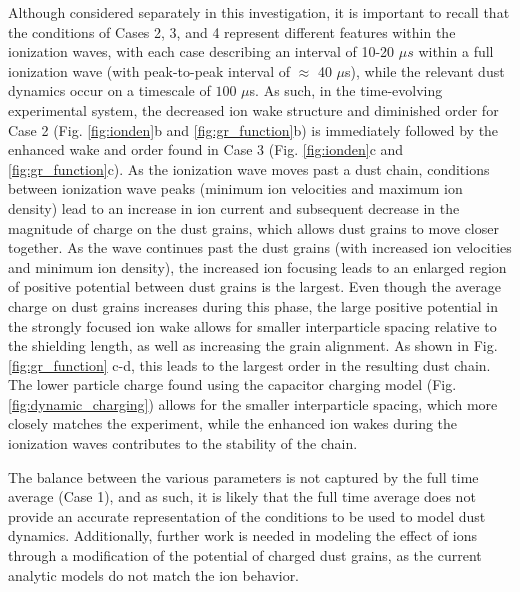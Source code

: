 \documentclass[aip,amsmath,amssymb,graphicx,floatfix,reprint]{revtex4-1}
\begin{document}
Although considered separately in this investigation, it is important to recall that the conditions of Cases 2, 3, and 4 represent different features within the ionization waves, with each case describing an interval of 10-20 $\mu s$ within a full ionization wave (with peak-to-peak interval of $\approx$ 40 $\mu$s), while the relevant dust dynamics occur on a timescale of $100$ $\mu$s.  As such, in the time-evolving experimental system, the decreased ion wake structure and diminished order for Case 2 (Fig. \ref{fig:ionden}b and \ref{fig:gr_function}b) is immediately followed by the enhanced wake and order found in Case 3 (Fig. \ref{fig:ionden}c and \ref{fig:gr_function}c).  As the ionization wave moves past a dust chain, conditions between ionization wave peaks (minimum ion velocities and maximum ion density) lead to an increase in ion current and subsequent decrease in the magnitude of charge on the dust grains, which allows dust grains to move closer together.  As the wave continues past the dust grains (with increased ion velocities and minimum ion density), the increased ion focusing leads to an enlarged region of positive potential between dust grains is the largest.  Even though the average charge on dust grains increases during this phase, the large positive potential in the strongly focused ion wake allows for smaller interparticle spacing relative to the shielding length, as well as increasing the grain alignment.  As shown in Fig.\ref{fig:gr_function} c-d, this leads to the largest order in the resulting dust chain.  The lower particle charge found using the capacitor charging model (Fig. \ref{fig:dynamic_charging}) allows for the smaller interparticle spacing, which more closely matches the experiment, while the enhanced ion wakes during the ionization waves contributes to the stability of the chain.

The balance between the various parameters is not captured by the full time average (Case 1), and as such, it is likely that the full time average does not provide an accurate representation of the conditions to be used to model dust dynamics.  Additionally, further work is needed in modeling the effect of ions through a modification of the potential of charged dust grains, as the current analytic models do not match the ion behavior.
\end{document}
